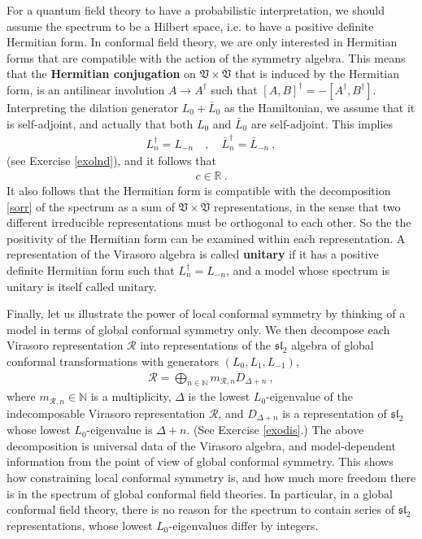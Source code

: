 \documentclass[12pt, a4paper, notitlepage, twoside]{report}
\numberwithin{equation}{section}
\theoremstyle{break}
\begin{document}
For a quantum field theory to have a probabilistic interpretation, 
we should assume the spectrum to be a Hilbert space, i.e. to have a positive definite Hermitian form. 
In conformal field theory, we are only interested in Hermitian forms that are compatible with the action of the symmetry algebra.
This means that the \textbf{Hermitian conjugation} on $\mathfrak{V}\times\overline{\mathfrak{V}}$ that is induced by the Hermitian form, is an antilinear involution $A\to A^\dagger$ such that $[A,B]^\dagger = -[A^\dagger, B^\dagger]$.
Interpreting the dilation generator $L_0+\bar L_0$ as the Hamiltonian, we assume that it is self-adjoint, and actually that both $L_0$ and $\bar L_0$ are self-adjoint.
This implies
\begin{align}
 L^\dagger_n = L_{-n} \quad , \quad \bar L_n^\dagger = \bar L_{-n}\ ,
\label{ldn}
\end{align}
(see Exercise \ref{exolnd}), and it follows that
\begin{align}
 c\in {\mathbb{R}}\ .
\label{cir}
\end{align}
It also follows that the Hermitian form is compatible with the decomposition \eqref{sorr} of the spectrum as a sum of $\mathfrak{V}\times \overline{\mathfrak{V}}$ representations, in the sense that two different irreducible representations must be orthogonal to each other.
So the the positivity of the Hermitian form can be examined within each representation.
A representation of the Virasoro algebra is called \textbf{\boldmath unitary} if it has a positive definite Hermitian form such that 
$L^\dagger_n = L_{-n}$, and a model whose spectrum is unitary is itself called unitary. 

Finally, let us illustrate the power of local conformal symmetry by thinking of a model in terms of global conformal symmetry only. 
We then decompose each Virasoro representation $\mathcal{R}$ into representations of the $\mathfrak{sl}_2$ algebra of global conformal transformations with generators $(L_0,L_1,L_{-1})$,
\begin{align}
 \mathcal{R}=\bigoplus_{n\in{\mathbb{N}}} m_{\mathcal{R},n} D_{\Delta+n}\ ,
\label{rbd}
\end{align}
where $m_{\mathcal{R},n}\in {\mathbb{N}}$ is a multiplicity, $\Delta$ is the lowest $L_0$-eigenvalue of the indecomposable Virasoro representation $\mathcal{R}$, and $D_{\Delta+n}$ is a representation of $\mathfrak{sl}_2$ whose lowest $L_0$-eigenvalue is $\Delta+n$.
(See Exercise \ref{exodis}.)
The above decomposition is universal data of the Virasoro algebra, and 
model-dependent information from the point of view of global conformal symmetry.
This shows how constraining local conformal symmetry is, and how much more freedom there is in the spectrum of global conformal field theories.
In particular, in a global conformal field theory, there is no reason for the spectrum to contain series of
$\mathfrak{sl}_2$ representations, whose lowest $L_0$-eigenvalues differ by integers. 
\end{document}
